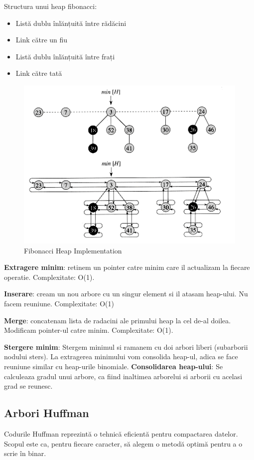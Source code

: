 \documentclass[11pt,a4paper]{article}
\theoremstyle{definition}
\theoremstyle{plain}
\theoremstyle{remark}
\begin{document}
Structura unui heap fibonacci:
\begin{itemize}
    \item Listă dublu înlănțuită între rădăcini
    \item Link către un fiu
    \item Listă dublu înlănțuită între frați
    \item Link către tată
\end{itemize}

\begin{figure}[H]
    \centering
    \includegraphics[width=0.75\linewidth]{fibonacci-heap2.png}
    \caption{Fibonacci Heap Implementation}
    \label{fig:enter-label}
\end{figure}

\textbf{Extragere minim}: retinem un pointer catre minim care il actualizam la fiecare operatie. Complexitate: O(1).

\textbf{Inserare}: cream un nou arbore cu un singur element si il atasam heap-ului. Nu facem reuniune. Complexitate: O(1)

\textbf{Merge}: concatenam lista de radacini ale primului heap la cel de-al doilea. Modificam pointer-ul catre minim. Complexitate: O(1).

\textbf{Stergere minim}: Stergem minimul si ramanem cu doi arbori liberi (subarborii nodului sters). La extragerea minimului vom consolida heap-ul, adica se face reuniune similar cu heap-urile binomiale. \textbf{Consolidarea heap-ului}: Se calculeaza gradul unui arbore, ca fiind inaltimea arborelui si arborii cu acelasi grad se reunesc.

\subsection{Arbori Huffman}
Codurile Huffman reprezintă o tehnică eficientă pentru compactarea datelor. Scopul este ca, pentru fiecare caracter, să alegem o metodă optimă pentru a o scrie în binar.
\end{document}
